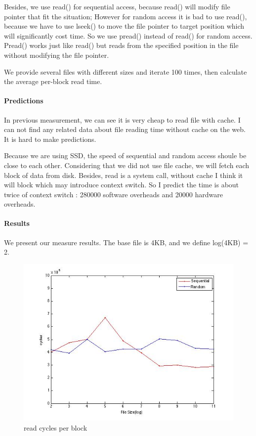 Besides, we use read() for sequential access, because read() will modify file pointer that fit the situation; However for random access it is bad to use read(), because we have to use lseek() to move the file pointer to target position which will significantly cost time. So we use pread() instead of read() for random access. Pread() works just like read() but reads from the specified position in the file without modifying the file pointer.

We provide several files with different sizes and iterate 100 times, then calculate  the average per-block read time.

\paragraph{Predictions}
In previous measurement, we can see it is very cheap to read file with cache. I can not find any related data about file reading time without cache on the web. It is hard to make predictions.

Because we are using SSD, the speed of sequential and random access shoule be close to each other. Considering that we did not use file cache, we will fetch each block of data from disk. Besides, read is a system call, without cache I think it will block which may introduce context switch. So I predict the time is about twice of context switch : 280000 software overheads and 20000 hardware overheads.

\paragraph{Results}
We present our measure results. The base file is 4KB, and we define log(4KB) = 2.

\begin{figure}[htbp] %
   \centering
   \includegraphics[width=5in]{./pics/42.jpg} 
   \caption{read cycles per block}
   \label{fig:read cycles per block}
\end{figure}

